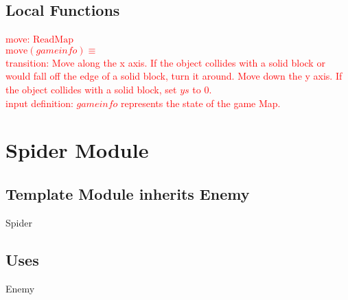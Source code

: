 \documentclass[12pt]{article}
\newcommand{\m}[1]{\mbox{#1}}
\begin{document}
\subsection*{Local Functions}

\noindent\textcolor{red}{ move: $\m{ReadMap}$\\
$\m{move}(gameinfo) \equiv$\\
transition: Move along the x axis. If the object collides with a solid block or would fall off the edge of a solid block, turn it around. Move down the y axis. If the object collides with a solid block, set $ys$ to 0.\\
input definition: $gameinfo$ represents the state of the game Map.\\}


\newpage

\section*{Spider Module}

\subsection*{Template Module inherits Enemy}

Spider

\subsection*{Uses}

Enemy
\end{document}
